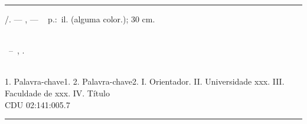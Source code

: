 \begin{fichacatalografica}
\sffamily{}
\vspace*{15cm} %
\hrule{} %
\begin{center} %
\begin{minipage}[c]{12.5cm} %
\imprimirautor{}
\hspace{0.5cm} \imprimirtitulo{}/\imprimirautor{}. ---
\imprimirlocal{}, \imprimirdata{} ---
\hspace{0.5cm}~\pageref{LastPage} p.:\ il. (alguma color.); 30 cm.\\
\hspace{0.5cm}\imprimirorientadorRotulo{}\imprimirorientador{}\\
\hspace{0.5cm}
\parbox[t]{\textwidth}{\imprimirtipotrabalho{}~--~\imprimirinstituicao{},
\imprimirdata{}.}\\
\hspace{0.5cm}
1. Palavra-chave1.
2. Palavra-chave2.
I. Orientador.
II\@. Universidade xxx.
III\@. Faculdade de xxx.
IV\@. Título\\
\hspace{8.75cm} CDU 02:141:005.7\\
\end{minipage}
\end{center}
\hrule
\end{fichacatalografica}
\cleardoublepage{}
